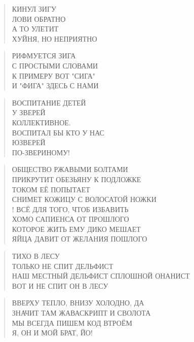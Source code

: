 \poemtitle{***}
\begin{verse}
КИНУЛ ЗИГУ\\
ЛОВИ ОБРАТНО\\
А ТО УЛЕТИТ\\
ХУЙНЯ, НО НЕПРИЯТНО
\end{verse}

\poemtitle{***}
\begin{verse}
РИФМУЕТСЯ ЗИГА\\
С ПРОСТЫМИ СЛОВАМИ\\
К ПРИМЕРУ ВОТ "СИГА"\\
И "ФИГА" ЗДЕСЬ С НАМИ
\end{verse}

\poemtitle{***}
\begin{verse}
ВОСПИТАНИЕ ДЕТЕЙ\\
      У ЗВЕРЕЙ\\
             КОЛЛЕКТИВНОЕ.\\
ВОСПИТАЛ БЫ КТО У НАС\\
        ЮЗВЕРЕЙ\\
              ПО-ЗВЕРИНОМУ!
\end{verse}

\poemtitle{***}
\begin{verse}
ОБЩЕСТВО РЖАВЫМИ БОЛТАМИ\\
ПРИКРУТИТ ОБЕЗЬЯНУ К ПОДЛОЖКЕ\\
ТОКОМ ЕЁ ПОПЫТАЕТ\\
СНИМЕТ КОЖИЦУ С ВОЛОСАТОЙ НОЖКИ\\!
ВСЁ ДЛЯ ТОГО, ЧТОБ ИЗБАВИТЬ\\
ХОМО САПИЕНСА ОТ ПРОШЛОГО\\
КОТОРОЕ ЖИТЬ ЕМУ ДИКО МЕШАЕТ\\
ЯЙЦА ДАВИТ ОТ ЖЕЛАНИЯ ПОШЛОГО
\end{verse}

\poemtitle{***}
\begin{verse}
ТИХО В ЛЕСУ\\
ТОЛЬКО НЕ СПИТ ДЕЛЬФИСТ\\
НАШ МЕСТНЫЙ ДЕЛЬФИСТ СПЛОШНОЙ ОНАНИСТ\\
ВОТ И НЕ СПИТ ОН В ЛЕСУ
\end{verse}

\poemtitle{***}
\begin{verse}
ВВЕРХУ ТЕПЛО, ВНИЗУ ХОЛОДНО, ДА\\
ЗНАЧИТ ТАМ ЖАВАСКРИПТ И СВОЛОТА\\
МЫ ВСЕГДА ПИШЕМ КОД ВТРОЁМ\\
Я, ОН И МОЙ БРАТ, ЙО!
\end{verse}

